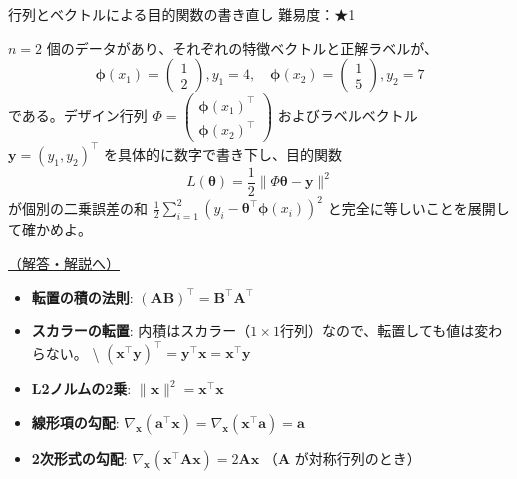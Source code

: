 \begin{questionbox}[label=q:3-3-1]{行列とベクトルによる目的関数の書き直し \hfill \normalfont \small 難易度：★1}

\(n=2\) 個のデータがあり、それぞれの特徴ベクトルと正解ラベルが、 \[
\boldsymbol{\phi}(x_1) = \begin{pmatrix} 1 \\ 2 \end{pmatrix}, y_1 = 4, \quad \boldsymbol{\phi}(x_2) = \begin{pmatrix} 1 \\ 5 \end{pmatrix}, y_2 = 7
\] である。デザイン行列
\(\Phi = \begin{pmatrix} \boldsymbol{\phi}(x_1)^\top \\ \boldsymbol{\phi}(x_2)^\top \end{pmatrix}\)
およびラベルベクトル \(\mathbf{y} = (y_1, y_2)^\top\)
を具体的に数字で書き下し、目的関数 \[
L(\boldsymbol{\theta}) = \frac{1}{2} \|\Phi\boldsymbol{\theta} - \mathbf{y}\|^2
\] が個別の二乗誤差の和
\(\frac{1}{2}\sum_{i=1}^2 (y_i - \boldsymbol{\theta}^\top \boldsymbol{\phi}(x_i))^2\)
と完全に等しいことを展開して確かめよ。

\hfill 

\hyperref[a:3-3-1]{（解答・解説へ）}

\end{questionbox}

\begin{tcolorbox}[enhanced, colback=blue!2!white, colframe=blue!60!black, fonttitle=\bfseries, drop shadow, title={【復習とヒント】行列・ベクトルの転置と微分公式}]

\begin{itemize}
\tightlist
\item
  \textbf{転置の積の法則}:
  \((\mathbf{A}\mathbf{B})^\top = \mathbf{B}^\top \mathbf{A}^\top\)
\item
  \textbf{スカラーの転置}:
  内積はスカラー（\(1 \times 1\)行列）なので、転置しても値は変わらない。
  \textbackslash{}
  \((\mathbf{x}^\top \mathbf{y})^\top = \mathbf{y}^\top \mathbf{x} = \mathbf{x}^\top \mathbf{y}\)
\item
  \textbf{L2ノルムの2乗}:
  \(\|\mathbf{x}\|^2 = \mathbf{x}^\top \mathbf{x}\)
\item
  \textbf{線形項の勾配}:
  \(\nabla_{\mathbf{x}} (\mathbf{a}^\top \mathbf{x}) = \nabla_{\mathbf{x}} (\mathbf{x}^\top \mathbf{a}) = \mathbf{a}\)
\item
  \textbf{2次形式の勾配}:
  \(\nabla_{\mathbf{x}} (\mathbf{x}^\top \mathbf{A} \mathbf{x}) = 2\mathbf{A}\mathbf{x}\)
  \quad （\(\mathbf{A}\) が対称行列のとき）
\end{itemize}

\end{tcolorbox}

